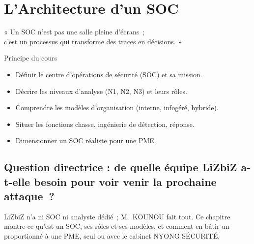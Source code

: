 
\chapter{L'Architecture d'un SOC}
\label{chap:soc}

\epigraph{%
    « Un SOC n'est pas une salle pleine d'écrans~;\\
    c'est un processus qui transforme des traces en décisions. »%
}{Principe du cours}


\begin{boxobjectifs}
\begin{itemize}
    \item Définir le centre d'opérations de sécurité (SOC) et sa mission.
    \item Décrire les niveaux d'analyse (N1, N2, N3) et leurs rôles.
    \item Comprendre les modèles d'organisation (interne, infogéré, hybride).
    \item Situer les fonctions chasse, ingénierie de détection, réponse.
    \item Dimensionner un SOC réaliste pour une PME.
\end{itemize}
\end{boxobjectifs}

\bigskip

\section*{Question directrice : de quelle équipe LiZbiZ a-t-elle besoin pour voir venir la prochaine attaque~?}

LiZbiZ n'a ni SOC ni analyste dédié~; M.~KOUNOU fait tout. Ce chapitre montre
ce qu'est un SOC, ses rôles et ses modèles, et comment en bâtir un
proportionné à une PME, seul ou avec le cabinet NYONG SÉCURITÉ.

